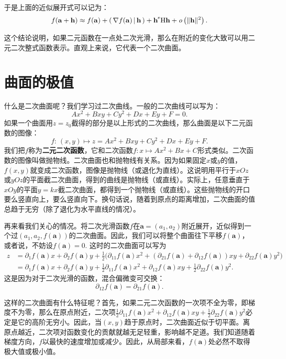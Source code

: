 \documentclass[12pt,UTF8]{ctexbook}
\begin{document}
于是上面的近似展开式可以记为：
\begin{align*}
    f(\mathbf{a} + \mathbf{h}) \approx f(\mathbf{a}) + \nji{\nabla f(\mathbf{a})}{\mathbf{h}} + \mathbf{h}^{\tr} \mathrm{H} \mathbf{h} + \olim{\|\mathbf{h}\|^2}.
\end{align*}

这个结论说明，如果二元函数在一点处二次光滑，那么在附近的变化大致可以用二元二次整式函数表示。直观上来说，它代表一个二次曲面。

\section{曲面的极值}

什么是二次曲面呢？我们学习过二次曲线。一般的二次曲线可以写为：
$$ Ax^2 + Bxy + Cy^2 + Dx + Ey + F = 0.$$
如果一个曲面用$z = z_0$截得的部分是以上形式的二次曲线，那么曲面是以下二元函数的图像：
$$ f: \, (x, y) \mapsto z = Ax^2 + Bxy + Cy^2 + Dx + Ey + F. $$
我们把$f$称为\textbf{二元二次函数}，它和二次函数$f:x\mapsto Ax^2 +Bx + C$形式类似。二次函数的图像叫做抛物线。二次曲面也和抛物线有关系。因为如果固定$x$或$y$的值，$f(x,y)$就变成二次函数，图像是抛物线（或退化为直线）。这说明用平行于$xOz$或$yOz$的平面截二次曲面，得到的曲线是抛物线（或直线）。实际上，任意垂直于$xOy$的平面$y = kx$截二次曲面，都得到一个抛物线（或直线）。这些抛物线的开口要么竖直向上，要么竖直向下。换句话说，随着到原点的距离增加，二次曲面的值总趋于无穷（除了退化为水平直线的情况）。

再来看我们关心的情况。将二次光滑函数$f$在$\mathbf{a}=(a_1,a_2)$附近展开，近似得到一个过$(a_1,a_2,f(\mathbf{a}))$的二次曲面。因此，我们可以将整个曲面往下平移$f(\mathbf{a})$，或者说，不妨设$f(\mathbf{a}) = 0.$ 这时的二次曲面可以写为
\begin{align*}
    z &= \partial_1 f(\mathbf{a}) x + \partial_2 f(\mathbf{a}) y + \frac{1}{2} \bigg(\partial_{11} f(\mathbf{a})x^2 + (\partial_{21} f(\mathbf{a}) + \partial_{12} f(\mathbf{a}))xy + \partial_{22} f(\mathbf{a})y^2\bigg) \\
    &= \partial_1 f(\mathbf{a}) x + \partial_2 f(\mathbf{a}) y + \frac{1}{2} \partial_{11} f(\mathbf{a})x^2 + \partial_{12} f(\mathbf{a})xy + \frac{1}{2}\partial_{22} f(\mathbf{a})y^2.
\end{align*}
这是因为对于二次光滑的函数，混合偏微变可交换：
$$ \partial_{12} f(\mathbf{a}) = \partial_{21} f(\mathbf{a}).$$

这样的二次曲面有什么特征呢？首先，如果二元二次函数的一次项不全为零，即梯度不为零，那么在原点附近，二次项$\frac{1}{2} \partial_{11} f(\mathbf{a})x^2 + \partial_{12} f(\mathbf{a})xy + \frac{1}{2}\partial_{22} f(\mathbf{a})y^2$必定是它的高阶无穷小。因此，当$(x,y)$趋于原点时，二次曲面近似于切平面。离原点越近，二次项对函数变化的贡献就越无足轻重，影响越不足道。我们知道随着梯度方向，$f$以最快的速度增加或减少。因此，从局部来看，$f(\mathbf{a})$处必然不取得极大值或极小值。
\end{document}
